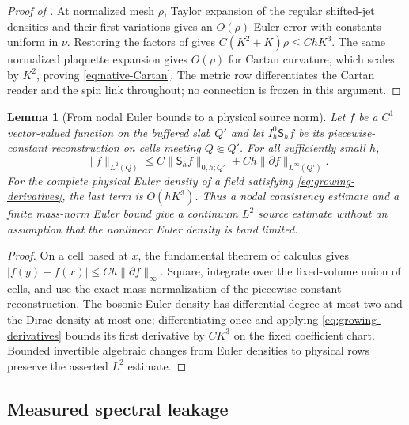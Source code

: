 \documentclass[11pt]{article}
\numberwithin{equation}{section}
\newtheorem{lemma}[lemma]{Lemma}
\theoremstyle{definition}
\theoremstyle{remark}
\newcommand{\norm}[1]{\lVert#1\rVert}
\begin{document}
\begin{proof}[Proof of ]
At normalized mesh $\rho$, Taylor expansion of the regular shifted-jet densities and their first variations gives an $O(\rho)$ Euler error with constants uniform in $\nu$.  Restoring the factors of  gives
$C(K^2+K)\rho\le ChK^3$.  The same normalized plaquette expansion gives $O(\rho)$ for Cartan curvature, which scales by $K^2$, proving \eqref{eq:native-Cartan}.  The metric row differentiates the Cartan reader and the spin link throughout; no connection is frozen in this argument.
\end{proof}

\begin{lemma}[From nodal Euler bounds to a physical source norm]
\label{lem:nodal-source-transfer}
Let $f$ be a $C^1$ vector-valued function on the buffered slab $Q'$ and let
$I_h^0\mathsf S_hf$ be its piecewise-constant reconstruction on cells
meeting $Q\Subset Q'$.  For all sufficiently small $h$,
\begin{equation}
 \norm{f}_{L^2(Q)}
 \le C\norm{\mathsf S_hf}_{0,h;Q'}
       +Ch\norm{\partial f}_{L^\infty(Q')}.
 \label{eq:nodal-source-transfer}
\end{equation}
For the complete physical Euler density of a field satisfying
\eqref{eq:growing-derivatives}, the last term is $O(hK^3)$.
Thus a nodal consistency estimate and a finite mass-norm Euler bound give
a continuum $L^2$ source estimate without an assumption that the nonlinear
Euler density is band limited.
\end{lemma}
\begin{proof}
On a cell based at $x$, the fundamental theorem of calculus gives
$|f(y)-f(x)|\le Ch\norm{\partial f}_\infty$.
Square, integrate over the fixed-volume union of cells, and use the exact
mass normalization of the piecewise-constant reconstruction.
The bosonic Euler density has differential degree at most two and the
Dirac density at most one; differentiating once and applying
\eqref{eq:growing-derivatives} bounds its first derivative by $CK^3$ on
the fixed coefficient chart.  Bounded invertible algebraic changes from
Euler densities to physical rows preserve the asserted $L^2$ estimate.
\end{proof}


\subsection{Measured spectral leakage}
\label{app:native-tails}
\end{document}
